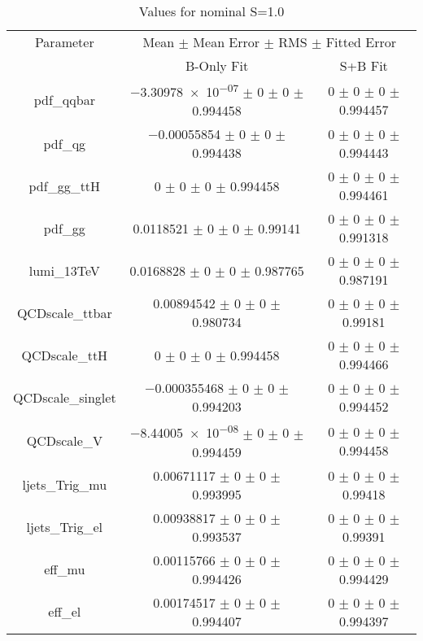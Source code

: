 \begin{table}
\centering
\caption{Values for nominal S=1.0}
\begin{tabular}{ccc}
\toprule
Parameter 	& \multicolumn{2}{c}{Mean $\pm$ Mean Error $\pm$ RMS $\pm$ Fitted Error}\\
 	& B-Only Fit & S+B Fit\\
\midrule
pdf\_qqbar 	& \num{-3.30978e-07} $\pm$ \num{0} $\pm$ \num{0} $\pm$ \num{0.994458} 	& \num{0} $\pm$ \num{0} $\pm$ \num{0} $\pm$ \num{0.994457}\\
pdf\_qg 	& \num{-0.00055854} $\pm$ \num{0} $\pm$ \num{0} $\pm$ \num{0.994438} 	& \num{0} $\pm$ \num{0} $\pm$ \num{0} $\pm$ \num{0.994443}\\
pdf\_gg\_ttH 	& \num{0} $\pm$ \num{0} $\pm$ \num{0} $\pm$ \num{0.994458} 	& \num{0} $\pm$ \num{0} $\pm$ \num{0} $\pm$ \num{0.994461}\\
pdf\_gg 	& \num{0.0118521} $\pm$ \num{0} $\pm$ \num{0} $\pm$ \num{0.99141} 	& \num{0} $\pm$ \num{0} $\pm$ \num{0} $\pm$ \num{0.991318}\\
lumi\_13TeV 	& \num{0.0168828} $\pm$ \num{0} $\pm$ \num{0} $\pm$ \num{0.987765} 	& \num{0} $\pm$ \num{0} $\pm$ \num{0} $\pm$ \num{0.987191}\\
QCDscale\_ttbar 	& \num{0.00894542} $\pm$ \num{0} $\pm$ \num{0} $\pm$ \num{0.980734} 	& \num{0} $\pm$ \num{0} $\pm$ \num{0} $\pm$ \num{0.99181}\\
QCDscale\_ttH 	& \num{0} $\pm$ \num{0} $\pm$ \num{0} $\pm$ \num{0.994458} 	& \num{0} $\pm$ \num{0} $\pm$ \num{0} $\pm$ \num{0.994466}\\
QCDscale\_singlet 	& \num{-0.000355468} $\pm$ \num{0} $\pm$ \num{0} $\pm$ \num{0.994203} 	& \num{0} $\pm$ \num{0} $\pm$ \num{0} $\pm$ \num{0.994452}\\
QCDscale\_V 	& \num{-8.44005e-08} $\pm$ \num{0} $\pm$ \num{0} $\pm$ \num{0.994459} 	& \num{0} $\pm$ \num{0} $\pm$ \num{0} $\pm$ \num{0.994458}\\
ljets\_Trig\_mu 	& \num{0.00671117} $\pm$ \num{0} $\pm$ \num{0} $\pm$ \num{0.993995} 	& \num{0} $\pm$ \num{0} $\pm$ \num{0} $\pm$ \num{0.99418}\\
ljets\_Trig\_el 	& \num{0.00938817} $\pm$ \num{0} $\pm$ \num{0} $\pm$ \num{0.993537} 	& \num{0} $\pm$ \num{0} $\pm$ \num{0} $\pm$ \num{0.99391}\\
eff\_mu 	& \num{0.00115766} $\pm$ \num{0} $\pm$ \num{0} $\pm$ \num{0.994426} 	& \num{0} $\pm$ \num{0} $\pm$ \num{0} $\pm$ \num{0.994429}\\
eff\_el 	& \num{0.00174517} $\pm$ \num{0} $\pm$ \num{0} $\pm$ \num{0.994407} 	& \num{0} $\pm$ \num{0} $\pm$ \num{0} $\pm$ \num{0.994397}\\

\end{tabular}
\end{table}
